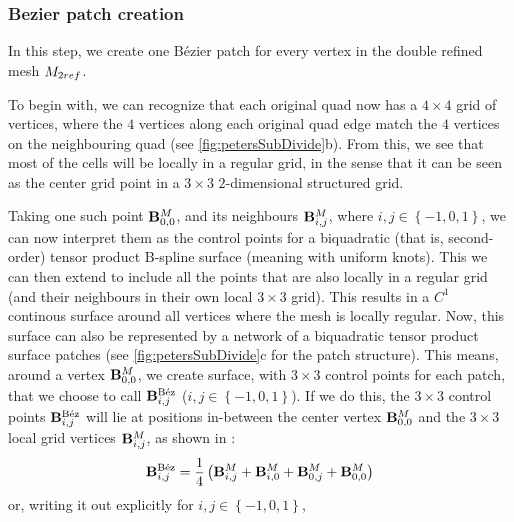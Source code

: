\subsubsection{Bezier patch creation}
In this step, we create one B{\'e}zier patch for every vertex in the double refined mesh $\petersControlMeshDobRef$. 

To begin with, we can recognize that each original quad now has a $4 \times 4$ grid of vertices, where the $4$ vertices along each original quad edge match the $4$ vertices on the neighbouring quad (see \autoref{fig:petersSubDivide}b). From this, we see that most of the cells will be locally in a regular grid, in the sense that it can be seen as the center grid point in a $3\times3$ $2$-dimensional structured grid.%

Taking one such point $\petersLocalPatchPointIndices{0,0}$, and its neighbours $\petersLocalPatchPointIndices{i,j}$, where $i,j \in \left \lbrace-1,0,1\right \rbrace$, we can now interpret them as the control points for a biquadratic (that is, second-order) tensor product B-spline surface (meaning with uniform knots). This we can then extend to include all the points that are also locally in a regular grid (and their neighbours in their own local $3\times3$ grid). This results in a $C^1$ continous surface around all vertices where the mesh is locally regular.
Now, this surface can also be represented by a network of a biquadratic tensor product \Bez surface patches (see \autoref{fig:petersSubDivide}c for the patch structure). This means, around a vertex $\petersLocalPatchPointIndices{0,0}$, we create \Bez surface, with $3\times3$ control points for each patch, that we choose to call $\petersLocalBezPointIndices{i,j}$ ($i,j \in \left \lbrace{-1},0,1\right \rbrace$). If we do this, the $3\times3$ \Bez control points $\petersLocalBezPointIndices{i,j}$ will lie at positions in-between the center vertex $\petersLocalPatchPointIndices{0,0}$ and the $3\times3$ local grid vertices $\petersLocalPatchPointIndices{i,j}$, as shown in \cite{peters1992constructing}:
\begin{equation}
\petersLocalBezPointIndices{i,j} = \frac{1}{4}\left(\petersLocalPatchPointIndices{i,j} + \petersLocalPatchPointIndices{i,0} + \petersLocalPatchPointIndices{0,j} + \petersLocalPatchPointIndices{0,0}\right)
\end{equation}
or, writing it out explicitly for $i,j \in \left \lbrace{-1},0,1\right \rbrace$,

